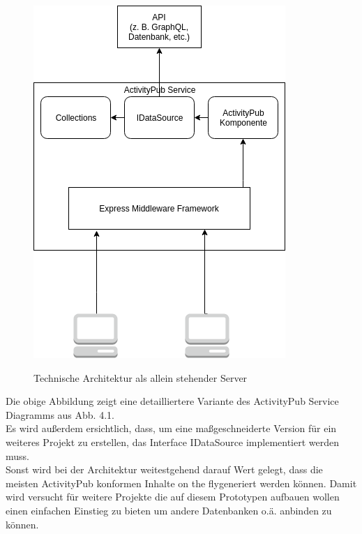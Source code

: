 	\begin{figure}[h]
		\begin{minipage}{\textwidth}
			\centering
			\includegraphics[scale=0.6]{figures/Technische-Architektur-standalone.png}
			\label{technische-architektur-standalone}
			\caption{Technische Architektur als allein stehender Server}
		\end{minipage}
	\end{figure}

	Die obige Abbildung zeigt eine detailliertere Variante des ActivityPub Service Diagramms aus Abb. 4.1.\\
	Es wird außerdem ersichtlich, dass, um eine maßgeschneiderte Version für ein weiteres Projekt zu erstellen, das Interface IDataSource implementiert werden muss.\\ 
	Sonst wird bei der Architektur weitestgehend darauf Wert gelegt, dass die meisten ActivityPub konformen Inhalte \glqq on the fly\grqq generiert werden können. Damit wird versucht für weitere Projekte die auf diesem Prototypen aufbauen wollen einen einfachen Einstieg zu bieten um andere Datenbanken o.ä. anbinden zu können.
